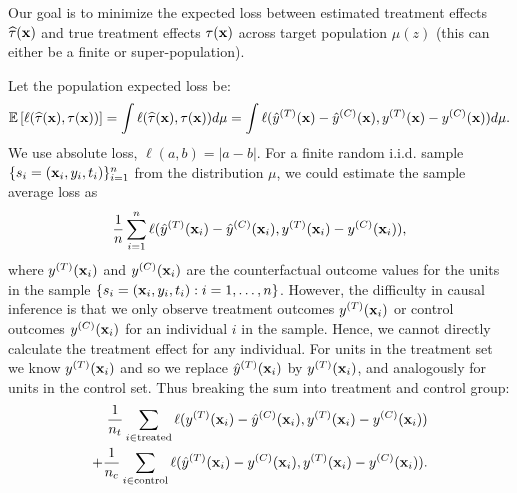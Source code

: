 Our goal is to minimize the expected loss between estimated treatment effects $\widehat{\tau}(\mathbf{x})$ and true treatment effects $\tau(\mathbf{x})$ across target population $\mu(z)$ (this can either be a finite or super-population).

Let the population expected loss be:
\begin{eqnarray*}
\mathbb{E}\left[ \ell(\widehat{\tau}(\mathbf{x}),\tau(\mathbf{x}))\right]
=
\int \ell(\widehat{\tau}(\mathbf{x}),\tau(\mathbf{x}))d\mu
=
\int \ell(\hat{y}^{(T)}(\mathbf{x})-\hat{y}^{(C)}(\mathbf{x}), {y}^{(T)}(\mathbf{x})-{y}^{(C)}(\mathbf{x})) d\mu.
\end{eqnarray*}
We use absolute loss, $\ell(a,b)=|a-b|$. 
For a finite random i.i.d$.$ sample $\{s_i=(\mathbf{x}_i,y_i,t_i)\}^n_{i=1}$ from the distribution $\mu$, we could estimate the sample average loss as 
\begin{eqnarray*}
\frac{1}{n}\sum_{i=1}^n \ell(\hat{y}^{(T)}(\mathbf{x}_i)-\hat{y}^{(C)}(\mathbf{x}_i), {y}^{(T)}(\mathbf{x}_i)-{y}^{(C)}(\mathbf{x}_i)),
\end{eqnarray*}
where $y^{(T)}(\mathbf{x}_i)$ and $y^{(C)}(\mathbf{x}_i)$ are the counterfactual outcome values for the units in the sample $\{s_i=(\mathbf{x}_i,y_i,t_i):i=1,\dots,n\}$.
However, the difficulty in causal inference is that we only observe treatment outcomes $y^{(T)}(\mathbf{x}_i)$ or control outcomes $y^{(C)}(\mathbf{x}_i)$ for an individual $i$ in the sample. Hence, we cannot directly calculate the treatment effect for any individual. For units in the treatment set we know $y^{(T)}(\mathbf{x}_i)$ and so we replace $\hat{y}^{(T)}(\mathbf{x}_i)$ by $y^{(T)}(\mathbf{x}_i)$, and analogously for units in the control set. Thus breaking the sum into treatment and control group:
\begin{eqnarray*}
\frac{1}{n_t}
\sum_{i \in \textrm{treated}} \ell(y^{(T)}(\mathbf{x}_i)-\hat{y}^{(C)}(\mathbf{x}_i), {y}^{(T)}(\mathbf{x}_i)-{y}^{(C)}(\mathbf{x}_i))\\
+ \frac{1}{n_c}
\sum_{i \in \textrm{control}} \ell(\hat{y}^{(T)}(\mathbf{x}_i)-y^{(C)}(\mathbf{x}_i), {y}^{(T)}(\mathbf{x}_i)-{y}^{(C)}(\mathbf{x}_i)).
\end{eqnarray*}

